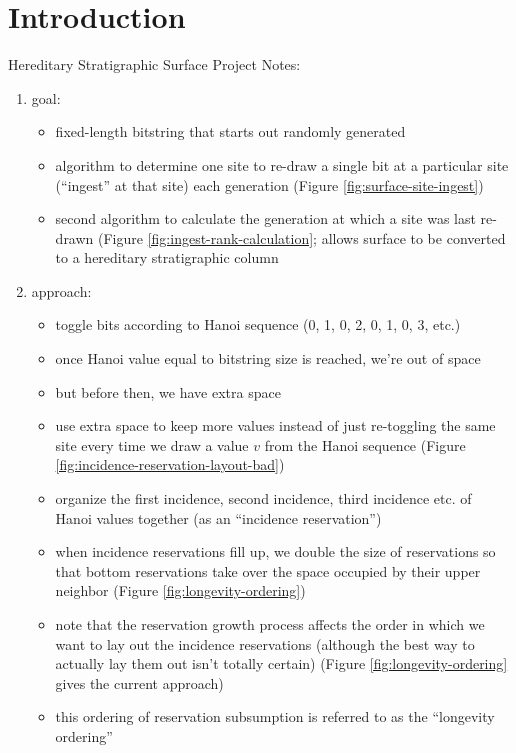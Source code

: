 \section{Introduction} \label{sec:introduction}

Hereditary Stratigraphic Surface Project Notes:

\begin{enumerate}
\item goal:
\begin{itemize}
  \item fixed-length bitstring that starts out randomly generated
  \item algorithm to determine one site to re-draw a single bit at a particular site (``ingest'' at that site) each generation (Figure \ref{fig:surface-site-ingest})
  \item second algorithm to calculate the generation at which a site was last re-drawn (Figure \ref{fig:ingest-rank-calculation}; allows surface to be converted to a hereditary stratigraphic column
\end{itemize}
\item approach:
\begin{itemize}
  \item toggle bits according to Hanoi sequence (0, 1, 0, 2, 0, 1, 0, 3, etc.)
  \item once Hanoi value equal to bitstring size is reached, we're out of space
  \item but before then, we have extra space
  \item use extra space to keep more values instead of just re-toggling the same site every time we draw a value $v$ from the Hanoi sequence (Figure \ref{fig:incidence-reservation-layout-bad})
  \item organize the first incidence, second incidence, third incidence etc. of Hanoi values together (as an ``incidence reservation'')
  \item when incidence reservations fill up, we double the size of reservations so that bottom reservations take over the space occupied by their upper neighbor (Figure \ref{fig:longevity-ordering})
  \item note that the reservation growth process affects the order in which we want to lay out the incidence reservations (although the best way to actually lay them out isn't totally certain) (Figure \ref{fig:longevity-ordering} gives the current approach)
  \item this ordering of reservation subsumption is referred to as the ``longevity ordering''

\end{itemize}
\end{enumerate}
